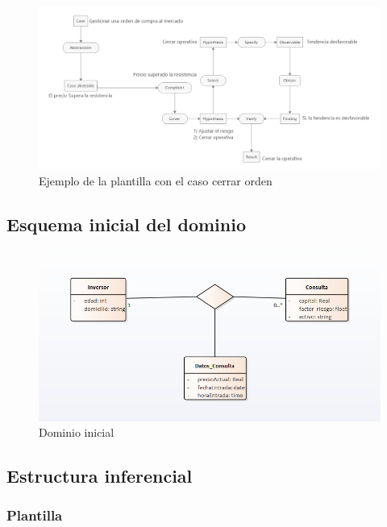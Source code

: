 \begin{figure}[H]
  \centering
  \includegraphics[scale=0.50]{imagenes/CasoCerrarOrden.png}
  \caption{\label{fig:CasoCerrarOrden}Ejemplo de la plantilla con el caso cerrar orden}
\end{figure}

\subsection{Esquema inicial del dominio}

\begin{figure}[H]
  \centering
  \includegraphics[scale=0.70]{imagenes/DominioInicial.png}
  \caption{\label{fig:DominioInicial}Dominio inicial}
\end{figure}

\subsection{Estructura inferencial}
\subsubsection{Plantilla}
